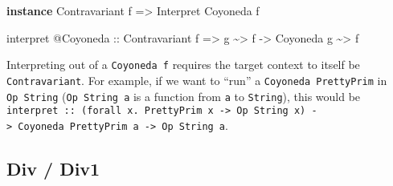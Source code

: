 \documentclass[]{article}
\newenvironment{Shaded}{}{}
\newcommand{\DataTypeTok}[1]{\textcolor[rgb]{0.56,0.13,0.00}{#1}}
\newcommand{\KeywordTok}[1]{\textcolor[rgb]{0.00,0.44,0.13}{\textbf{#1}}}
\newcommand{\NormalTok}[1]{#1}
\newcommand{\OperatorTok}[1]{\textcolor[rgb]{0.40,0.40,0.40}{#1}}
\newcommand{\OtherTok}[1]{\textcolor[rgb]{0.00,0.44,0.13}{#1}}
\begin{document}
\begin{itemize}
\begin{Shaded}
\begin{Highlighting}[]
\KeywordTok{instance} \DataTypeTok{Contravariant}\NormalTok{ f }\OtherTok{=>} \DataTypeTok{Interpret} \DataTypeTok{Coyoneda}\NormalTok{ f}

\NormalTok{interpret }\OperatorTok{@}\DataTypeTok{Coyoneda}
\OtherTok{    ::} \DataTypeTok{Contravariant}\NormalTok{ f}
    \OtherTok{=>}\NormalTok{ g }\OperatorTok{\textasciitilde{}>}\NormalTok{ f}
    \OtherTok{{-}>} \DataTypeTok{Coyoneda}\NormalTok{ g }\OperatorTok{\textasciitilde{}>}\NormalTok{ f}
\end{Highlighting}
\end{Shaded}

  Interpreting out of a \texttt{Coyoneda\ f} requires the target context to
  itself be \texttt{Contravariant}. For example, if we want to ``run'' a
  \texttt{Coyoneda\ PrettyPrim} in \texttt{Op\ String} (\texttt{Op\ String\ a}
  is a function from \texttt{a} to \texttt{String}), this would be
  \texttt{interpret\ ::\ (forall\ x.\ PrettyPrim\ x\ -\textgreater{}\ Op\ String\ x)\ -\textgreater{}\ Coyoneda\ PrettyPrim\ a\ -\textgreater{}\ Op\ String\ a}.
\end{itemize}

\hypertarget{div-div1}{%
\subsection{Div / Div1}\label{div-div1}}
\end{document}
